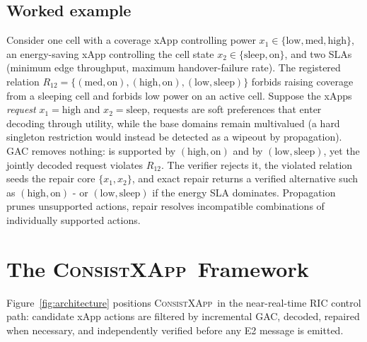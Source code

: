\documentclass[pdflatex,sn-mathphys-num,iicol,oneside]{sn-jnl}
\newcommand{\method}{\textsc{ConsistXApp}}
\begin{document}
\subsection{Worked example}
\label{sec:worked-example}

Consider one cell with a coverage xApp controlling power
$x_1\in\{\text{low},\text{med},\text{high}\}$, an energy-saving xApp
controlling the cell state $x_2\in\{\text{sleep},\text{on}\}$, and two
SLAs (minimum edge throughput, maximum handover-failure rate). The
registered relation
$R_{12}=\{(\text{med},\text{on}),(\text{high},\text{on}),
(\text{low},\text{sleep})\}$
forbids raising coverage from a sleeping cell and forbids low power on
an active cell. Suppose the xApps \emph{request} $x_1=\text{high}$ and
$x_2=\text{sleep}$, requests are soft preferences that enter decoding
through utility, while the base domains remain multivalued (a hard
singleton restriction would instead be detected as a wipeout by
propagation). GAC removes nothing:  is supported by
$(\text{high},\text{on})$ and  by
$(\text{low},\text{sleep})$, yet the jointly decoded request violates
$R_{12}$.
The verifier rejects it, the violated relation seeds the repair core
$\{x_1,x_2\}$, and exact repair returns a verified alternative such as
$(\text{high},\text{on})$ - or $(\text{low},\text{sleep})$ if the
energy SLA dominates. Propagation prunes unsupported actions, repair
resolves incompatible combinations of individually supported actions.
\section{The \method\ Framework}
\label{sec:method}

Figure~\ref{fig:architecture} positions \method\ in the near-real-time
RIC control path: candidate xApp actions are filtered by incremental
GAC, decoded, repaired when necessary, and independently verified
before any E2 message is emitted.
\end{document}
